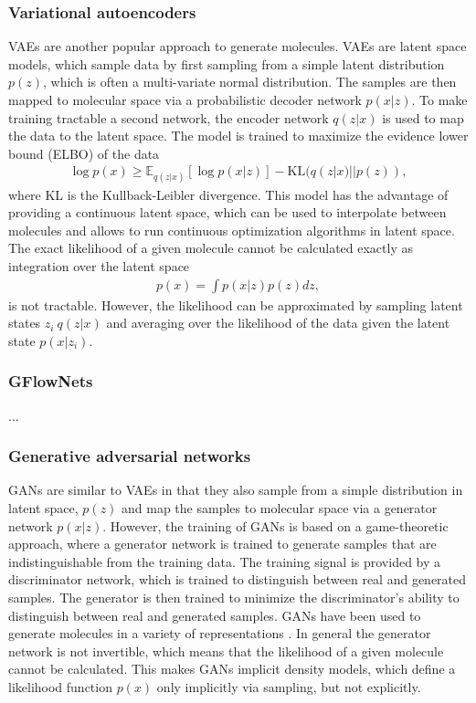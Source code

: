 \subsubsection{Variational autoencoders}
\Acp{VAE} are another popular approach to generate molecules. \Acp{VAE} are latent space models,
which sample data by first sampling from a simple latent distribution $p(z)$, which is often a
multi-variate normal distribution. The samples are then mapped to molecular space via a
probabilistic decoder network $p(x|z)$. To make training tractable a second network, the encoder
network $q(z|x)$ is used to map the data to the latent space. The model is trained to maximize the
evidence lower bound (ELBO) of the data
\begin{align}
      \log p(x) \geq \mathbb{E}_{q(z|x)}[\log p(x|z)] - \text{KL}(q(z|x) || p(z)),
\end{align}
where KL is the Kullback-Leibler divergence. This model has the advantage of providing a continuous
latent space, which can be used to interpolate between molecules and allows to run continuous
optimization algorithms in latent space. The exact likelihood of a given molecule cannot be
calculated exactly as integration over the latent space
\begin{align}
      p(x) = \int p(x|z) p(z) dz,
\end{align}
is not tractable. However, the likelihood can be approximated by sampling latent states $z_i ~
      q(z|x)$ and averaging over the likelihood of the data given the latent state $p(x|z_i)$.

\subsubsection{GFlowNets} ...

\subsubsection{Generative adversarial networks}
\Acp{GAN} are similar to VAEs in that they also sample from a simple distribution in latent space,
$p(z)$ and map the samples to molecular space via a generator network $p(x|z)$. However, the
training of GANs is based on a game-theoretic approach, where a generator network is trained to
generate samples that are indistinguishable from the training data. The training signal is provided
by a discriminator network, which is trained to distinguish between real and generated samples. The
generator is then trained to minimize the discriminator's ability to distinguish between real and
generated samples. GANs have been used to generate molecules in a variety of representations
\citep{todo}. In general the generator network is not invertible, which means that the likelihood of
a given molecule cannot be calculated. This makes GANs implicit density models, which define a
likelihood function $p(x)$ only implicitly via sampling, but not explicitly.

